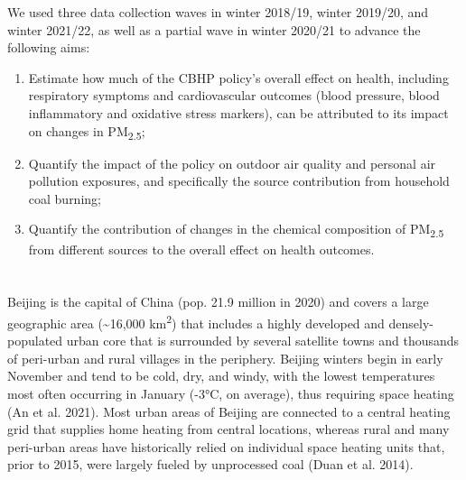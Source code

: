 \documentclass[
  letterpaper,
  DIV=11,
  numbers=noendperiod]{scrartcl}
\providecommand{\DIFaddtex}[1]{{\protect\color{blue}\uwave{#1}}} %
\providecommand{\DIFaddbegin}{} %
\providecommand{\DIFaddend}{} %
\providecommand{\DIFdelbegin}{} %
\providecommand{\DIFdelend}{} %
\providecommand{\DIFadd}[1]{\texorpdfstring{\DIFaddtex{#1}}{#1}} %
\newcommand{\DIFscaledelfig}{0.5}
\newlength{\DIFdelgraphicswidth} %
\newlength{\DIFdelgraphicsheight} %
\newcommand{\DIFaddincludegraphics}[2][]{{\color{blue}\fbox{\DIFOincludegraphics[#1]{#2}}}} %
\newcommand{\DIFdelincludegraphics}[2][]{%
\sbox{\DIFdelgraphicsbox}{\DIFOincludegraphics[#1]{#2}}%
\settoboxwidth{\DIFdelgraphicswidth}{\DIFdelgraphicsbox} %
\settoboxtotalheight{\DIFdelgraphicsheight}{\DIFdelgraphicsbox} %
\scalebox{\DIFscaledelfig}{%
\parbox[b]{\DIFdelgraphicswidth}{\usebox{\DIFdelgraphicsbox}\\[-\baselineskip] \rule{\DIFdelgraphicswidth}{0em}}\llap{\resizebox{\DIFdelgraphicswidth}{\DIFdelgraphicsheight}{%
\setlength{\unitlength}{\DIFdelgraphicswidth}%
\begin{picture}(1,1)%
\thicklines\linethickness{2pt} %
{\color[rgb]{1,0,0}\put(0,0){\framebox(1,1){}}}%
{\color[rgb]{1,0,0}\put(0,0){\line( 1,1){1}}}%
{\color[rgb]{1,0,0}\put(0,1){\line(1,-1){1}}}%
\end{picture}%
}\hspace*{3pt}}} %
} %
\DeclareRobustCommand{\DIFaddbegin}{\DIFOaddbegin \let\includegraphics\DIFaddincludegraphics} %
\DeclareRobustCommand{\DIFaddend}{\DIFOaddend \let\includegraphics\DIFOincludegraphics} %
\DeclareRobustCommand{\DIFdelbegin}{\DIFOdelbegin \let\includegraphics\DIFdelincludegraphics} %
\DeclareRobustCommand{\DIFdelend}{\DIFOaddend \let\includegraphics\DIFOincludegraphics} %
\begin{document}
We used three data collection waves in winter 2018/19, winter 2019/20,
and winter 2021/22, as well as a partial wave in winter 2020/21 to
advance the following aims:

\begin{enumerate}
\def\labelenumi{\arabic{enumi}.}
\item
  Estimate how much of the CBHP policy's overall effect on health,
  including respiratory symptoms and cardiovascular outcomes (blood
  pressure, blood inflammatory and oxidative stress markers), can be
  attributed to its impact on changes in PM\textsubscript{2.5};
\item
  Quantify the impact of the policy on outdoor air quality and personal
  air pollution exposures, and specifically the source contribution from
  household coal burning;
\item
  Quantify the contribution of changes in the chemical composition of
  PM\textsubscript{2.5} from different sources to the overall effect on
  health outcomes.
\end{enumerate}

\DIFdelbegin %
\DIFdelend \DIFaddbegin \section{\DIFadd{Study Design and Methods}}\label{study-design-and-methods}
\DIFaddend 

\DIFdelbegin %
\DIFdelend \DIFaddbegin \subsection{\DIFadd{Study area}}\label{study-area}
\DIFaddend 

Beijing is the capital of China (pop. 21.9 million in 2020) and covers a
large geographic area (\textasciitilde16,000 km\textsuperscript{2}) that
includes a highly developed and densely-populated urban core that is
surrounded by several satellite towns and thousands of peri-urban and
rural villages in the periphery. Beijing winters begin in early November
and tend to be cold, dry, and windy, with the lowest temperatures most
often occurring in January (-3°C, on average), thus requiring space
heating (An et al. 2021). Most urban areas of Beijing are connected to a
central heating grid that supplies home heating from central locations,
whereas rural and many peri-urban areas have historically relied on
individual space heating units that, prior to 2015, were largely fueled
by unprocessed coal (Duan et al. 2014).
\end{document}
